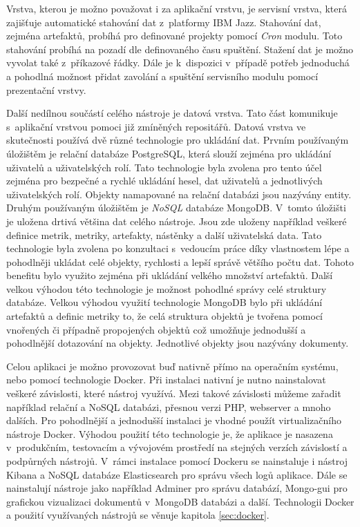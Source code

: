 \documentclass[czech,master]{diploma}
\begin{document}
Vrstva, kterou je možno považovat i za aplikační vrstvu, je servisní vrstva, která zajišťuje automatické stahování dat z~platformy IBM Jazz. Stahování dat, zejména artefaktů, probíhá pro definované projekty pomocí \textit{Cron} modulu. Toto stahování probíhá na pozadí dle definovaného času spuštění. Stažení dat je možno vyvolat také z~příkazové řádky. Dále je k~dispozici v~případě potřeb jednoduchá a pohodlná možnost přidat zavolání a spuštění servisního modulu pomocí prezentační vrstvy.

Další nedílnou součástí celého nástroje je datová vrstva. Tato část komunikuje s~aplikační vrstvou pomoci již zmíněných repositářů. Datová vrstva ve skutečnosti používá dvě různé technologie pro ukládání dat. Prvním používaným úložištěm je relační databáze PostgreSQL, která slouží zejména pro ukládání uživatelů a uživatelských rolí. Tato technologie byla zvolena pro tento účel zejména pro bezpečné a rychlé ukládání hesel, dat uživatelů a jednotlivých uživatelských rolí. Objekty namapované na relační databázi jsou nazývány entity. Druhým používaným úložištěm je \textit{NoSQL} databáze MongoDB. V~tomto úložišti je uložena drtivá většina dat celého nástroje. Jsou zde uloženy například veškeré definice metrik, metriky, artefakty, nástěnky a další uživatelská data. Tato technologie byla zvolena po konzultaci s~vedoucím práce díky vlastnostem lépe a pohodlněji ukládat celé objekty, rychlosti a lepší správě většího počtu dat. Tohoto benefitu bylo využito zejména při ukládání velkého množství artefaktů. Další velkou výhodou této technologie je možnost pohodlné správy celé struktury databáze. Velkou výhodou využití technologie MongoDB bylo při ukládání artefaktů a definic metriky to, že celá struktura objektů je tvořena pomocí vnořených či případně propojených objektů což umožňuje jednodušší a pohodlnější dotazování na objekty. Jednotlivé objekty jsou nazývány dokumenty.


Celou aplikaci je možno provozovat buď nativně přímo na operačním systému, nebo pomocí technologie Docker. Při instalaci nativní je nutno nainstalovat veškeré závislosti, které nástroj využívá. Mezi takové závislosti můžeme zařadit například relační a NoSQL databázi, přesnou verzi PHP, webserver a mnoho dalších. Pro pohodlnější a jednodušší instalaci je vhodné použít virtualizačního nástroje Docker. Výhodou použití této technologie je, že aplikace je nasazena v~produkčním, testovacím a vývojovém prostředí na stejných verzích závislostí a podpůrných nástrojů. V~rámci instalace pomocí Dockeru se nainstaluje i nástroj Kibana a NoSQL databáze Elasticsearch pro správu všech logů aplikace. Dále se nainstalují nástroje jako například Adminer pro správu databází,  Mongo-gui pro grafickou vizualizaci dokumentů v~MongoDB databázi a další. Technologii Docker a použití využívaných nástrojů se věnuje kapitola \ref{sec:docker}.
\end{document}

